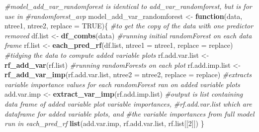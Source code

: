 \documentclass[12pt,twoside]{reedthesis}
\newenvironment{Shaded}{\begin{snugshade}}{\end{snugshade}}
\newcommand{\KeywordTok}[1]{\textcolor[rgb]{0.13,0.29,0.53}{\textbf{#1}}}
\newcommand{\DataTypeTok}[1]{\textcolor[rgb]{0.13,0.29,0.53}{#1}}
\newcommand{\DecValTok}[1]{\textcolor[rgb]{0.00,0.00,0.81}{#1}}
\newcommand{\StringTok}[1]{\textcolor[rgb]{0.31,0.60,0.02}{#1}}
\newcommand{\CommentTok}[1]{\textcolor[rgb]{0.56,0.35,0.01}{\textit{#1}}}
\newcommand{\OtherTok}[1]{\textcolor[rgb]{0.56,0.35,0.01}{#1}}
\newcommand{\ControlFlowTok}[1]{\textcolor[rgb]{0.13,0.29,0.53}{\textbf{#1}}}
\newcommand{\NormalTok}[1]{#1}
\theoremstyle{definition}
\theoremstyle{definition}
\theoremstyle{definition}
\theoremstyle{remark}
\begin{document}
\begin{Shaded}
\begin{Highlighting}[]
{\CommentTok{#model_add_var_randomforest is identical to add_var_randomforest, but is for use in }
\CommentTok{#randomforest_avp}
\NormalTok{model_add_var_randomforest <-}\StringTok{ }\ControlFlowTok{function}\NormalTok{(data, ntree1, ntree2, }\DataTypeTok{replace =} \OtherTok{TRUE}\NormalTok{)\{}
  \CommentTok{#to get the copy of the data with one predictor removed}
\NormalTok{  df.list <-}\StringTok{ }\KeywordTok{df_combs}\NormalTok{(data)}
  \CommentTok{#running initial randomForest on each data frame}
\NormalTok{  rf.list <-}\StringTok{ }\KeywordTok{each_pred_rf}\NormalTok{(df.list, }\DataTypeTok{ntree1 =}\NormalTok{ ntree1, }\DataTypeTok{replace =}\NormalTok{ replace)}
  \CommentTok{#tidying the data to compute added variable plots}
\NormalTok{  rf.add.var.list <-}\StringTok{ }\KeywordTok{rf_add_var}\NormalTok{(rf.list)}
  \CommentTok{#running randomForests on each plot}
\NormalTok{  rf.add.imp.list <-}\StringTok{ }\KeywordTok{rf_add_var_imp}\NormalTok{(rf.add.var.list, }\DataTypeTok{ntree2 =}\NormalTok{ ntree2, }\DataTypeTok{replace =}\NormalTok{ replace)}
  \CommentTok{#extracts variable importance values for each randomForest ran on added variable plots}
\NormalTok{  add.var.imp <-}\StringTok{ }\KeywordTok{extract_var_imp}\NormalTok{(rf.add.imp.list)}
  \CommentTok{#output is list containing data frame of added variable plot variable importances, }
  \CommentTok{#rf.add.var.list which are dataframe for added variable plots, and }
  \CommentTok{#the variable importances from full model run in each_pred_rf}
  \KeywordTok{list}\NormalTok{(add.var.imp, rf.add.var.list, rf.list[[}\DecValTok{2}\NormalTok{]])}
\NormalTok{\}}

}
\end{Highlighting}
\end{Shaded}
\end{document}
